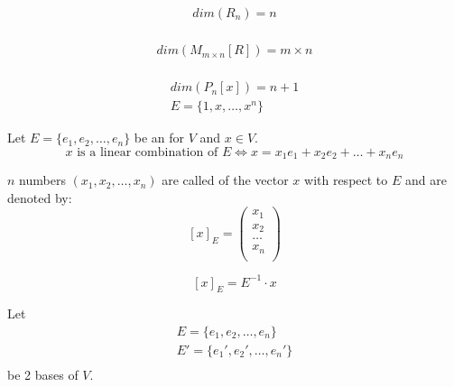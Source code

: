    \begin{align*}
      dim(R_{n}) = n \\
    \end{align*}

    \begin{align*}
      dim(M_{m \times n}[R]) = m \times n \\
    \end{align*}

    \begin{align*}
      dim(P_{n}[x]) = n + 1 \\
      E = \{1, x, \ldots, x^{n}\}
    \end{align*}


    \par Let $E = \{e_{1}, e_{2}, \ldots, e_{n}\}$ be an  for
    $V$ and $x \in V$.
    \[
      x \mbox{ is a linear combination of } E
        \Leftrightarrow x = x_{1} e_{1} + x_{2} e_{2} + \ldots + x_{n} e_{n}
    \]
    \par $n$ numbers $(x_{1}, x_{2}, \ldots, x_{n})$ are called 
    of the vector $x$ with respect to $E$ and are denoted by:
    \[
      [x]_{E} =
      \begin{pmatrix}
        x_{1}  \\
        x_{2}  \\
        \ldots \\
        x_{n}  \\
      \end{pmatrix}
    \]
    
    \[
      [x]_{E} = E^{-1} \cdot x
    \]

    \par Let
    \begin{align*}
      E  = \{e_{1},  e_{2},  \ldots, e_{n}\}  \\
      E' = \{e_{1}', e_{2}', \ldots, e_{n}'\} \\
    \end{align*}
    be 2 bases of $V$.


